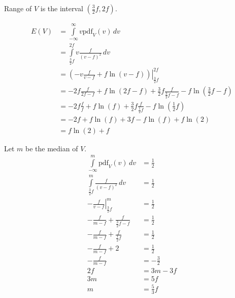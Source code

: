\documentclass[a4paper]{article}
\begin{document}
Range of \(V\) is the interval \(\boxed{\left(\frac32f,2f\right)}\).

\[\begin{aligned}
	E(V)&=\int\limits_{-\infty}^{\infty}v\mathrm{pdf}_V(v)\,dv\\
	    &=\int\limits_{\frac32f}^{2f}v\frac f{(v-f)^2}\,dv\\
	    &=\left.\left(-v\frac f{v-f}+f\ln(v-f)\right)\right|_{\frac32f}^{2f}\\
	    &=-2f\frac f{2f-f}+f\ln(2f-f)+\frac32f\frac f{\frac32f-f}-f\ln\left(\frac32f-f\right)\\
	    &=-2f\frac ff+f\ln(f)+\frac32f\frac f{\frac12f}-f\ln\left(\frac12f\right)\\
	    &=-2f+f\ln(f)+3f-f\ln(f)+f\ln(2)\\
	    &=\boxed{f\ln(2)+f}
\end{aligned}\]

Let \(m\) be the median of \(V\).
\[\begin{aligned}
	\int\limits_{-\infty}^m\mathrm{pdf}_V(v)\,dv&=\frac12\\
	\int\limits_{\frac32f}^m\frac f{(v-f)^2}\,dv&=\frac12\\
	\left.-\frac f{v-f}\right|_{\frac32f}^m&=\frac12\\
	-\frac f{m-f}+\frac f{\frac32f-f}&=\frac12\\
	-\frac f{m-f}+\frac f{\frac12f}&=\frac12\\
	-\frac f{m-f}+2&=\frac12\\
	-\frac f{m-f}&=-\frac32\\
	2f&=3m-3f\\
	3m&=5f\\
	m&=\boxed{\frac53f}
\end{aligned}\]
\end{document}

